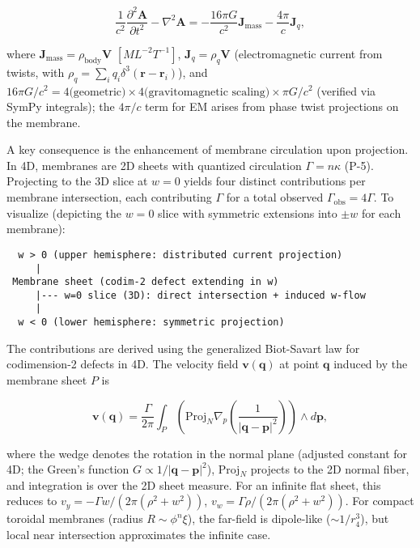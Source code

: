 \begin{equation}
\frac{1}{c^2} \frac{\partial^2 \mathbf{A}}{\partial t^2} - \nabla^2 \mathbf{A} = -\frac{16\pi G}{c^2} \mathbf{J}_{\text{mass}} - \frac{4\pi}{c} \mathbf{J}_q,
\end{equation}

where $\mathbf{J}_{\text{mass}} = \rho_{\text{body}} \mathbf{V}$ $[M L^{-2} T^{-1}]$, $\mathbf{J}_q = \rho_q \mathbf{V}$ (electromagnetic current from twists, with $\rho_q = \sum_i q_i \delta^3(\mathbf{r} - \mathbf{r}_i)$), and $16\pi G/c^2 = 4 \text{(geometric)} \times 4 \text{(gravitomagnetic scaling)} \times \pi G/c^2$ (verified via SymPy integrals); the $4\pi/c$ term for EM arises from phase twist projections on the membrane.

A key consequence is the enhancement of membrane circulation upon projection. In 4D, membranes are 2D sheets with quantized circulation $\Gamma = n \kappa$ (P-5). Projecting to the 3D slice at $w=0$ yields four distinct contributions per membrane intersection, each contributing $\Gamma$ for a total observed $\Gamma_{\text{obs}} = 4\Gamma$. To visualize (depicting the $w=0$ slice with symmetric extensions into $\pm w$ for each membrane):

\begin{verbatim}
  w > 0 (upper hemisphere: distributed current projection)
     |
 Membrane sheet (codim-2 defect extending in w)
     |--- w=0 slice (3D): direct intersection + induced w-flow
     |
  w < 0 (lower hemisphere: symmetric projection)
\end{verbatim}

The contributions are derived using the generalized Biot-Savart law for codimension-2 defects in 4D. The velocity field $\mathbf{v}(\mathbf{q})$ at point $\mathbf{q}$ induced by the membrane sheet $P$ is

\[
\mathbf{v}(\mathbf{q}) = \frac{\Gamma}{2\pi} \int_P \left( \text{Proj}_N \nabla_p \left( \frac{1}{|\mathbf{q} - \mathbf{p}|^2} \right) \right) \wedge d\mathbf{p},
\]

where the wedge denotes the rotation in the normal plane (adjusted constant for 4D; the Green's function $G \propto 1/|\mathbf{q}-\mathbf{p}|^2$), Proj$_N$ projects to the 2D normal fiber, and integration is over the 2D sheet measure. For an infinite flat sheet, this reduces to $v_y = -\Gamma w / (2\pi (\rho^2 + w^2))$, $v_w = \Gamma \rho / (2\pi (\rho^2 + w^2))$. For compact toroidal membranes (radius $R \sim \phi^n \xi$), the far-field is dipole-like ($\sim 1/r_4^3$), but local near intersection approximates the infinite case.

